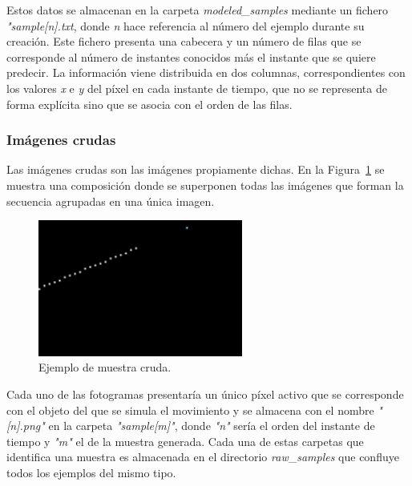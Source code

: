 Estos datos se almacenan en la carpeta \textit{modeled}\_\textit{samples} mediante un fichero \textit{"sample[n].txt}, donde \textit{n} hace referencia al número del ejemplo durante su creación. Este fichero presenta una cabecera y un número de filas que se corresponde al número de instantes conocidos más el instante que se quiere predecir. La información viene distribuida en dos columnas, correspondientes con los valores \textit{x} e \textit{y} del píxel en cada instante de tiempo, que no se representa de forma explícita sino que se asocia con el orden de las filas.

\subsubsection{Imágenes crudas}

Las imágenes crudas son las imágenes propiamente dichas. En la Figura~\ref{fig.cruda} se muestra una composición donde se superponen todas las imágenes que forman la secuencia agrupadas en una única imagen.

\begin{figure}[H]
		\begin{center}
			\includegraphics[width=0.6\textwidth]{ figures/samples/linear_sample.png}
			\caption{Ejemplo de muestra cruda.}
			\label{fig.cruda}
		\end{center}
\end{figure}
\vspace{-10pt}
Cada uno de las fotogramas presentaría un único píxel activo que se corresponde con el objeto del que se simula el movimiento y se almacena con el nombre \textit{"[n].png"} en la carpeta \textit{"sample[m]"}, donde \textit{"n"} sería el orden del instante de tiempo y \textit{"m"} el de la muestra generada. Cada una de estas carpetas que identifica una muestra es almacenada en el directorio \textit{raw}\_\textit{samples} que confluye todos los ejemplos del mismo tipo.\\

